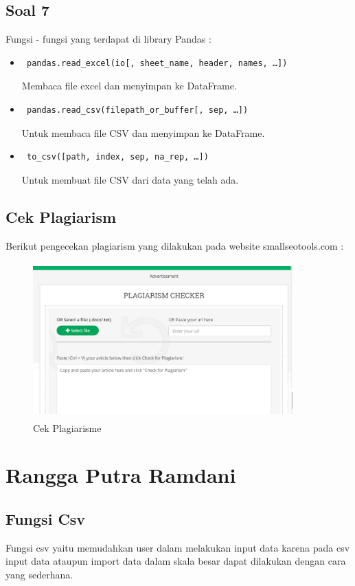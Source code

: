 \subsection{Soal 7}
Fungsi - fungsi yang terdapat di library Pandas : 
\begin{itemize}
	\item \begin{verbatim} pandas.read_excel(io[, sheet_name, header, names, …])  \end{verbatim} Membaca file excel dan menyimpan ke DataFrame.
	\item \begin{verbatim} pandas.read_csv(filepath_or_buffer[, sep, …]) \end{verbatim} Untuk membaca file CSV dan menyimpan ke DataFrame.
	\item \begin{verbatim} to_csv([path, index, sep, na_rep, …]) \end{verbatim}
	Untuk membuat file CSV dari data yang telah ada.	
\end{itemize}
\subsection{Cek Plagiarism}
Berikut pengecekan plagiarism yang dilakukan pada website smallseotools.com : 
\begin{figure}[!htbp]
	\centering
	\includegraphics[height=6cm, width=10cm]{figures/4/1174041/Teori/plagiarism.png}
	\caption{Cek Plagiarisme}
	\label{plagiarism}
\end{figure}

\section{Rangga Putra Ramdani}
\subsection{Fungsi Csv}
Fungsi csv yaitu memudahkan user dalam melakukan input data karena pada csv input data ataupun import data dalam skala besar dapat dilakukan dengan cara yang sederhana.
